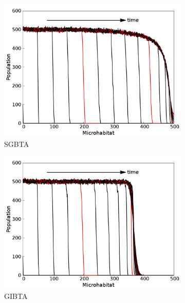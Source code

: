 \documentclass[a4paper,12pt]{article}
\begin{document}
\begin{figure}[H]
 \centering
 \begin{subfigure}[h]{0.3\textwidth}
 \includegraphics[width=\textwidth]{simple-slowGrowers-alpha=0_004884694070738408-spatialDistb}
  \caption{SGBTA}
  \label{subfig:SGBTA-spatdistb-spef_alpha}
  \end{subfigure}
  \begin{subfigure}[h]{0.3\textwidth}
   \includegraphics[width=\textwidth]{simple-flatGrowers-alpha=0_004884694070738408-spatialDistb}
   \caption{GIBTA}
   \label{subfig:GIBTA-spatdistb-spef_alpha}
  \end{subfigure}
  \begin{subfigure}[h]{0.3\textwidth}

\end{subfigure}
\end{figure}
\end{document}
